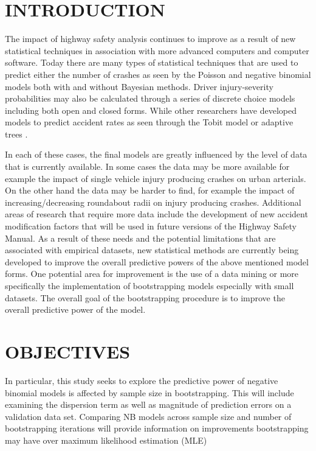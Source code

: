\documentclass[titlepage,12pt,times,nopageno]{article}
\begin{document}
\section*{\label{sec:intro}\normalsize INTRODUCTION}
The impact of highway safety analysis continues to improve as a result of new statistical techniques in association with more advanced computers and computer software.  Today there are many types of statistical techniques that are used to predict either the number of crashes as seen by the Poisson and negative binomial models both with and without Bayesian methods.  Driver injury-severity probabilities may also be calculated through a series of discrete choice models including both open and closed forms.  While other researchers have developed models to predict accident rates as seen through the Tobit model \citep{anas2008tav} or adaptive trees \citep{karlaftis2002erg}.\par
        In each of these cases, the final models are greatly influenced by the level of data that is currently available.  In some cases the data may be more available for example the impact of single vehicle injury producing crashes on urban arterials.  On the other hand the data may be harder to find, for example the impact of increasing/decreasing roundabout radii on injury producing crashes.  Additional areas of research that require more data include the development of new accident modification factors that will be used in future versions of the Highway Safety Manual.  As a result of these needs and the potential limitations that are associated with empirical datasets, new statistical methods are currently being developed to improve the overall predictive powers of the above mentioned model forms.  One potential area for improvement is the use of a data mining or more specifically the implementation of bootstrapping models especially with small datasets.  The overall goal of the bootstrapping procedure is to improve the overall predictive power of the model.
\section*{\normalsize OBJECTIVES}
In particular, this study seeks to explore the predictive power of negative binomial models is affected by sample size in bootstrapping.  This will include examining the dispersion term as well as magnitude of prediction errors on a validation data set.  Comparing NB models across sample size and number of bootstrapping iterations will provide information on improvements bootstrapping may have over maximum likelihood estimation (MLE)
\end{document}
